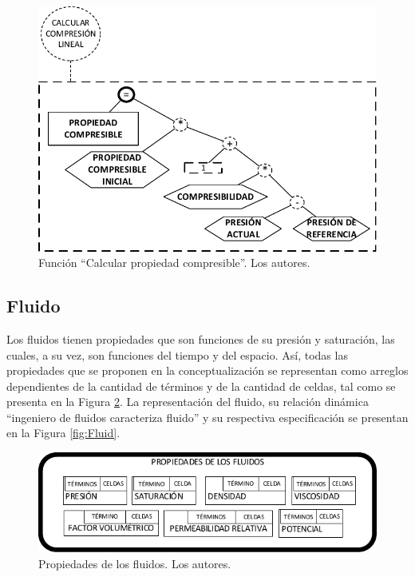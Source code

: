 \begin{figure}[h]
	\centering%
	\includegraphics[scale=0.5]{Fig/PropiedadCompresible.pdf}%
	\caption[Función ``Calcular propiedad compresible''.]{Función ``Calcular propiedad compresible''. Los autores.} \label{fig:Porosity}
\end{figure}

\subsection{Fluido}\label{subsec:PS_Phase}

Los fluidos tienen propiedades que son funciones de su presión y saturación, las cuales, a su vez, son funciones del tiempo y del espacio. Así, todas las propiedades que se proponen en la conceptualización se representan como arreglos dependientes de la cantidad de términos y de la cantidad de celdas, tal como se presenta en la Figura \ref{fig:FluidProps}. La representación del fluido, su relación dinámica ``ingeniero de fluidos caracteriza fluido'' y su respectiva especificación se presentan en la Figura \ref{fig:Fluid}.\\

\begin{figure}[h]
	\centering%
	\includegraphics[width=0.9\linewidth]{Fig/PropiedadesDeFluidos.pdf}%
	\caption[Caracterización del fluido.]{Propiedades de los fluidos. Los autores.} \label{fig:FluidProps}
\end{figure}

